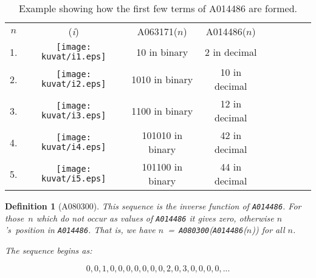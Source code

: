 \documentclass[11pt]{article} %
\newcommand{\catint}[1]{({\it #1})}
\newcommand{\EISseq}[1]{{\tt #1}}
\newtheorem{definition}[theorem]{Definition}
\begin{document}
\begin{table}[htbp]
\setlength{\extrarowheight}{0.3in}
\begin{tabular}{c c c c c c c c c}
$n$ & \catint{i} & A063171($n$) & A014486($n$)\\

1. \vspace{0.1in} & \texttt{[image: kuvat/i1.eps]} & 10 in binary & 2 in decimal\\
2. \vspace{0.1in} & \texttt{[image: kuvat/i2.eps]} & 1010 in binary & 10 in decimal\\
3. \vspace{0.1in} & \texttt{[image: kuvat/i3.eps]} & 1100 in binary & 12 in decimal\\
4. \vspace{0.1in} & \texttt{[image: kuvat/i4.eps]} & 101010 in binary & 42 in decimal\\
5. \vspace{0.1in} & \texttt{[image: kuvat/i5.eps]} & 101100 in binary & 44 in decimal\\

\end{tabular}
\caption{Example showing how the first few terms of A014486 are formed.}
\end{table}

\begin{definition}[{A080300}]
\normalfont

This sequence is the inverse function of \EISseq{A014486}.
For those~$n$ which do not occur as values
of \EISseq{A014486} it gives zero, otherwise $n$'s~position
in \EISseq{A014486}.
That is, we have $n$~=~\EISseq{A080300}(\EISseq{A014486}($n$)) for all
$n$. %

The sequence begins as:

$$
0,0,1,0,0,0,0,0,0,0,2,0,3,0,0,0,0,...
$$


\end{definition}

\newcommand{\binexpSexp}{\bf{binexp\ensuremath{\rightarrow}Sexp}}
\newcommand{\Sexpbinexp}{\bf{Sexp\ensuremath{\rightarrow}binexp}}

\newcommand{\Catnum}[1] {\ensuremath{C_{#1}}}

\newcommand{\CatsetN} {\{\Catnum{n}~structures~of~size~$n$\}}
\newcommand{\CatsetM} {\{\Catnum{m}~structures~of~size~$m$\}}
\newcommand{\MathCatsetN} {\{\Catnum{n}~structures~of~size~n\}}
\newcommand{\MathCatsetM} {\{\Catnum{m}~structures~of~size~m\}}
\end{document}

